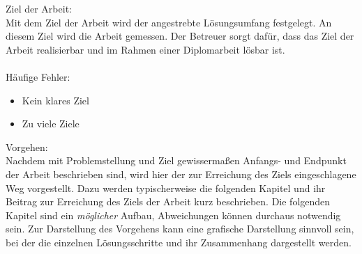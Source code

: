 \noindent Ziel der Arbeit:\\
Mit dem Ziel der Arbeit wird der angestrebte Lösungsumfang festgelegt. An diesem Ziel wird die Arbeit gemessen.
Der Betreuer sorgt dafür, dass das Ziel der Arbeit realisierbar und im Rahmen einer Diplomarbeit lösbar ist.\\\\
\noindent Häufige Fehler:
\begin{itemize}
	\item Kein klares Ziel
	\item Zu viele Ziele
\end{itemize}


\noindent Vorgehen:\\
Nachdem mit Problemstellung und Ziel gewissermaßen Anfangs- und Endpunkt der Arbeit beschrieben sind, wird hier der zur Erreichung des Ziels eingeschlagene Weg vorgestellt. Dazu werden typischerweise die folgenden Kapitel und ihr Beitrag zur Erreichung des Ziels der Arbeit kurz beschrieben. Die folgenden Kapitel sind ein {\em möglicher} Aufbau, Abweichungen können durchaus notwendig sein. Zur Darstellung des Vorgehens kann eine grafische Darstellung sinnvoll sein, bei der die einzelnen Lösungsschritte und ihr Zusammenhang dargestellt werden.

